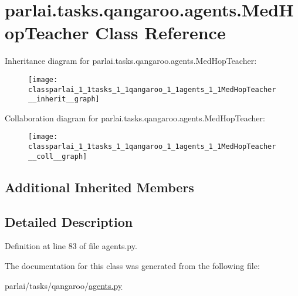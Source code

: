 \hypertarget{classparlai_1_1tasks_1_1qangaroo_1_1agents_1_1MedHopTeacher}{}\section{parlai.\+tasks.\+qangaroo.\+agents.\+Med\+Hop\+Teacher Class Reference}
\label{classparlai_1_1tasks_1_1qangaroo_1_1agents_1_1MedHopTeacher}


Inheritance diagram for parlai.\+tasks.\+qangaroo.\+agents.\+Med\+Hop\+Teacher\+:
\nopagebreak
\begin{figure}[H]
\begin{center}
\leavevmode
\texttt{[image: classparlai\_1\_1tasks\_1\_1qangaroo\_1\_1agents\_1\_1MedHopTeacher\_\_inherit\_\_graph]}
\end{center}
\end{figure}


Collaboration diagram for parlai.\+tasks.\+qangaroo.\+agents.\+Med\+Hop\+Teacher\+:
\nopagebreak
\begin{figure}[H]
\begin{center}
\leavevmode
\texttt{[image: classparlai\_1\_1tasks\_1\_1qangaroo\_1\_1agents\_1\_1MedHopTeacher\_\_coll\_\_graph]}
\end{center}
\end{figure}
\subsection*{Additional Inherited Members}


\subsection{Detailed Description}


Definition at line 83 of file agents.\+py.



The documentation for this class was generated from the following file\+:\begin{DoxyCompactItemize}
\item 
parlai/tasks/qangaroo/\hyperlink{parlai_2tasks_2qangaroo_2agents_8py}{agents.\+py}\end{DoxyCompactItemize}
